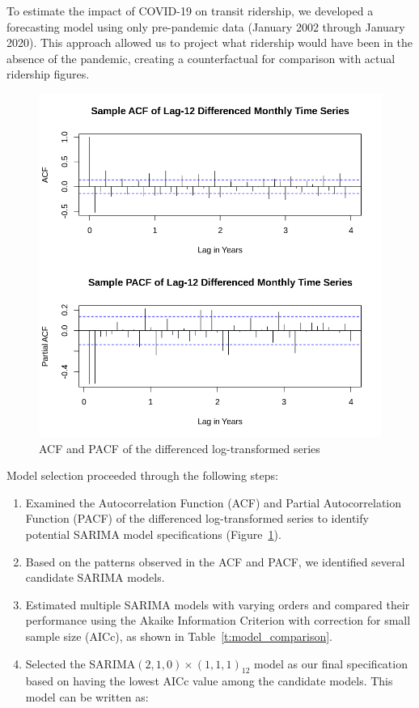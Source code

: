\documentclass[11pt]{article}
\begin{document}
To estimate the impact of COVID-19 on transit ridership, we developed a forecasting model using only pre-pandemic data (January 2002 through January 2020). This approach allowed us to project what ridership would have been in the absence of the pandemic, creating a counterfactual for comparison with actual ridership figures.

\begin{figure}[!ht]
\centering
\includegraphics[width=0.525\linewidth]{diff_acf_pacf.png}
\caption{ACF and PACF of the differenced log-transformed series}
\label{f:acf_pacf_diff}
\end{figure}

Model selection proceeded through the following steps:

\begin{enumerate}
  \item Examined the Autocorrelation Function (ACF) and Partial Autocorrelation Function (PACF) of the differenced log-transformed series to identify potential SARIMA model specifications (Figure~\ref{f:acf_pacf_diff}).
  
  \item Based on the patterns observed in the ACF and PACF, we identified several candidate SARIMA models.
  
  \item Estimated multiple SARIMA models with varying orders and compared their performance using the Akaike Information Criterion with correction for small sample size (AICc), as shown in Table~\ref{t:model_comparison}.
  
  \item Selected the SARIMA$(2,1,0)\times(1,1,1)_{12}$ model as our final specification based on having the lowest AICc value among the candidate models. This model can be written as:
\end{enumerate}
\end{document}
